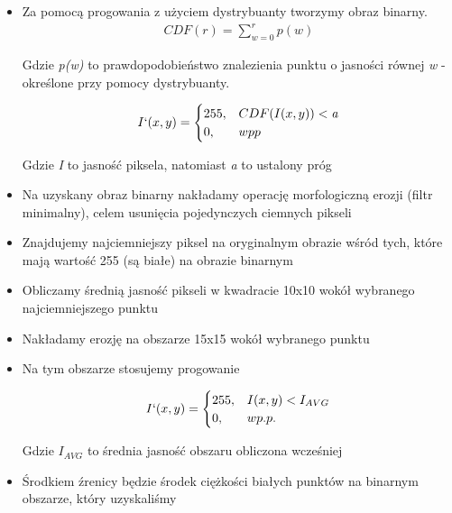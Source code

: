 \begin{itemize}
    \item Za pomocą progowania z użyciem dystrybuanty tworzymy obraz binarny.\\
    \begin{align}
        CDF(r) = \sum_{w=0}^{r} p(w)
    \end{align}
    
    Gdzie \textit{p(w)} to prawdopodobieństwo znalezienia punktu o jasności równej \textit{w} - określone przy pomocy dystrybuanty.
    
    \begin{align}
        I`(x, y) = 
        \begin{cases}
            255, &  CDF(I(x, y)) < \textit{a}\\
            0,   &  wpp
        \end{cases}
    \end{align} 
    
    Gdzie \textit{I} to jasność piksela, natomiast \textit{a} to ustalony próg

    \item Na uzyskany obraz binarny nakładamy operację morfologiczną erozji (filtr minimalny), celem usunięcia pojedynczych ciemnych pikseli
    
    \item Znajdujemy najciemniejszy piksel na oryginalnym obrazie wśród tych, które mają wartość 255 (są białe) na obrazie binarnym
    
    \item Obliczamy średnią jasność pikseli w kwadracie 10x10 wokół wybranego najciemniejszego punktu
    
    \item Nakładamy erozję na obszarze 15x15 wokół wybranego punktu
    \item Na tym obszarze stosujemy progowanie
    
    \begin{align}
        I`(x, y) = 
        \begin{cases}
            255, &  I(x, y) < I_{AVG}\\
            0,   &  wp.p.
        \end{cases}
    \end{align}
    
    Gdzie \textit{$I_{AVG}$} to średnia jasność obszaru obliczona wcześniej
    
    \item Środkiem źrenicy będzie środek ciężkości białych punktów na binarnym obszarze, który uzyskaliśmy

\end{itemize}

